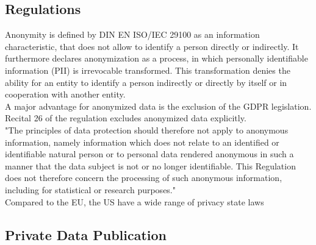     \subsection{Regulations}
        \label{subsec:related:law}
        Anonymity is defined by DIN EN ISO/IEC 29100 as an information characteristic, that does not allow to identify a person directly or indirectly\cite{german_institute_for_standardization_din_2020}. It furthermore declares anonymization as a process, in which personally identifiable information (PII) is irrevocable transformed. This transformation denies the ability for an entity to identify a person indirectly or directly by itself or in cooperation with another entity\cite{german_institute_for_standardization_din_2020}.\\
        
        A major advantage for anonymized data is the exclusion of the GDPR legislation. Recital 26 of the regulation excludes anonymized data explicitly.\\ 
        "The principles of data protection should therefore not apply to anonymous information, namely information which does not relate to an identified or identifiable natural person or to personal data rendered anonymous in such a manner that the data subject is not or no longer identifiable. This Regulation does not therefore concern the processing of such anonymous information, including for statistical or research purposes."\cite{european_union_regulation_2016}\\
        Compared to the EU, the US have a wide range of privacy state laws
    \subsection{Private Data Publication}
        \label{subsec:related:private_data_analysis}
    
